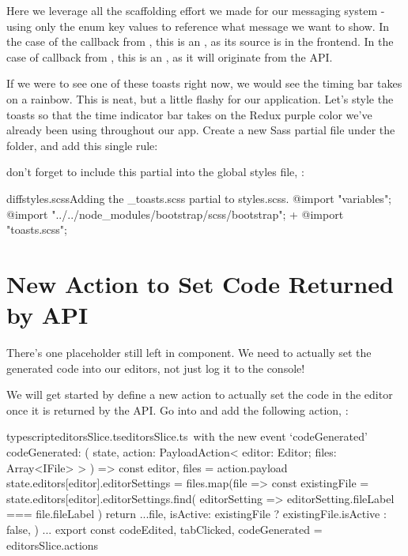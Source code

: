 \documentclass[paper=6in:9in,pagesize=pdftex,headinclude=on,footinclude=on,12pt,twoside]{scrbook}
\begin{document}
Here we leverage all the scaffolding effort we made for our messaging system - using only the enum key values to reference what message we want to show. In the case of the  callback from , this is an , as its source is in the frontend. In the case of  callback from , this is an , as it will originate from the API.

If we were to see one of these toasts right now, we would see the timing bar takes on a rainbow. This is neat, but a little flashy for our application. Let's style the toasts so that the time indicator bar takes on the Redux purple color we've already been using throughout our app. Create a new Sass partial file  under the  folder, and add this single rule:


don't forget to include this partial into the global styles file, :

\begin{codeInput}{diff}{styles.scss}{Adding the \_toasts.scss partial to styles.scss.}
@import "variables";
@import "../../node_modules/bootstrap/scss/bootstrap";
+ @import "toasts.scss";
\end{codeInput}

\section{New Action to Set Code Returned by API}

There's one placeholder  still left in  component. We need to actually set the generated code into our editors, not just log it to the console! 


We will get started by define a new action to actually set the code in the editor once it is returned by the API. Go into  and add the following action, :

\begin{codeInput}{typescript}{editorsSlice.ts}{editorsSlice.ts\, with the new event `codeGenerated'}
codeGenerated: (
  state,
  action: PayloadAction<{ editor: Editor; files: Array<IFile> }>
) => {
  const { editor, files } = action.payload
  state.editors[editor].editorSettings = files.map(file => {
    const existingFile = state.editors[editor].editorSettings.find(
      editorSetting => editorSetting.fileLabel === file.fileLabel
    )
    return {
      ...file,
      isActive: existingFile ? existingFile.isActive : false,
    }
  })
}
...
export const { codeEdited, tabClicked, codeGenerated } = editorsSlice.actions
\end{codeInput}
\end{document}
